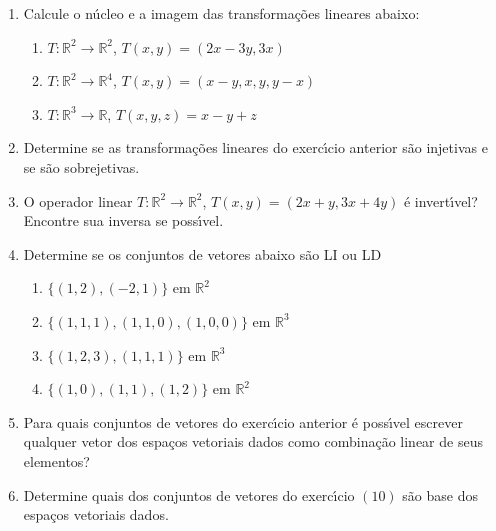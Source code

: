 \documentclass[a4paper,5pt]{amsbook}
\begin{document}
\vspace{1cm}
\begin{enumerate}
	\vspace{0.5cm}
	\item Calcule o n\'ucleo e a imagem das transforma\c{c}\~oes lineares abaixo:
		\begin{enumerate}
			\item $T:\mathbb{R}^2 \rightarrow \mathbb{R}^2$,
				$T(x,y) = (2x-3y, 3x)$
			\item $T:\mathbb{R}^2 \rightarrow \mathbb{R}^4$,
				$T(x,y) = (x-y, x, y, y - x)$
			\item $T:\mathbb{R}^3 \rightarrow \mathbb{R}$,
				$T(x,y,z) = x - y + z$
		\end{enumerate}

	\vspace{0.5cm}
	\item Determine se as transforma\c{c}\~oes lineares do exerc\'{\i}cio anterior s\~ao
		injetivas e se s\~ao sobrejetivas.

	\vspace{0.5cm}
	\item O operador linear $T:\mathbb{R}^2 \rightarrow \mathbb{R}^2$, $T(x,y)
		= (2x+y, 3x+4y)$ \'e invert\'{\i}vel? Encontre sua inversa se poss\'{\i}vel.

	\vspace{0.5cm}
	\item Determine se os conjuntos de vetores abaixo s\~ao LI ou LD
		\begin{enumerate}
			\item $\{(1,2), (-2, 1)\}$ em $\mathbb{R}^2$
			\item $\{(1,1,1), (1,1,0), (1,0,0)\}$ em $\mathbb{R}^3$
			\item $\{(1,2,3), (1,1,1)\}$ em $\mathbb{R}^3$
			\item $\{(1,0), (1,1), (1,2)\}$ em $\mathbb{R}^2$
		\end{enumerate}

	\vspace{0.5cm}
	\item Para quais conjuntos de vetores do exerc\'{\i}cio anterior \'e poss\'{\i}vel
		escrever qualquer vetor dos espa\c{c}os vetoriais dados como combina\c{c}\~ao
		linear de seus elementos?

	\vspace{0.5cm}
	\item Determine quais dos conjuntos de vetores do exerc\'{\i}cio $(10)$ s\~ao
		base dos espa\c{c}os vetoriais dados.
\end{enumerate}
\end{document}
